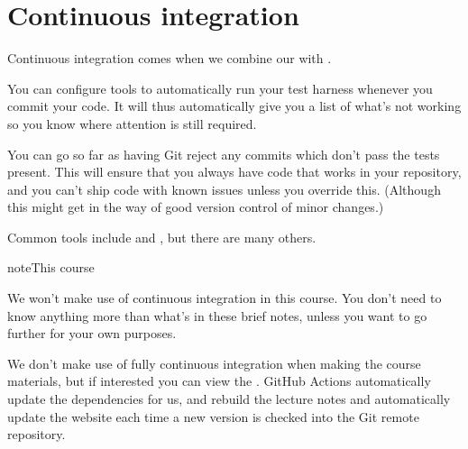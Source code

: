 \documentclass[letterpaper,10pt,british]{sphinxmanual}
\begin{document}
\sphinxstepscope


\section{Continuous integration}
\label{\detokenize{chapters/software_development_tools/continuous_integration:continuous-integration}}\label{\detokenize{chapters/software_development_tools/continuous_integration::doc}}
\sphinxAtStartPar
Continuous integration comes when we combine our {\hyperref[\detokenize{chapters/software_development_tools/version_control:version-control}]{}} with {\hyperref[\detokenize{chapters/software_development_tools/automated_testing:automated-testing}]{}}.

\sphinxAtStartPar
You can configure tools to automatically run your test harness whenever you commit your code. It will thus automatically give you a list of what’s not working so you know where attention is still required.

\sphinxAtStartPar
You can go so far as having Git reject any commits which don’t pass the tests present. This will ensure that you always have code that works in your repository, and you can’t ship code with known issues unless you override this. (Although this might get in the way of good version control of minor changes.)

\sphinxAtStartPar
Common tools include  and , but there are many others.

\begin{sphinxadmonition}{note}{This course}

\sphinxAtStartPar
We won’t make use of continuous integration in this course. You don’t need to know anything more than what’s in these brief notes, unless you want to go further for your own purposes.

\sphinxAtStartPar
We don’t make use of fully continuous integration when making the course materials, but if interested you can view the . GitHub Actions automatically update the dependencies for us, and re\sphinxhyphen{}build the lecture notes and automatically update the website each time a new version is checked into the Git remote repository.
\end{sphinxadmonition}
\end{document}
